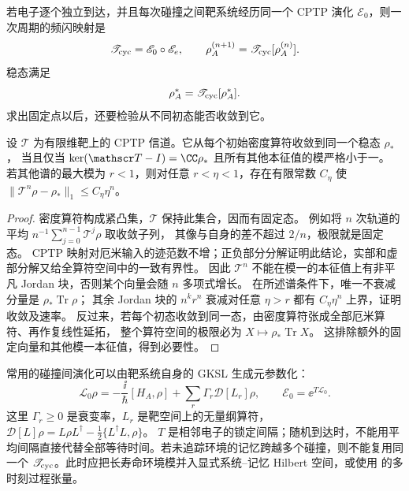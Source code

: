 若电子逐个独立到达，并且每次碰撞之间靶系统经历同一个 CPTP 演化 $\mathscr E_0$，则一次周期的频闪映射是
\begin{equation}
{
\mathscr T_{\rm cyc}=\mathscr E_0\circ\mathscr E_e,
\qquad
\rho_A^{(n+1)}=\mathscr T_{\rm cyc}[\rho_A^{(n)}].}
\label{eq:feberi_stroboscopic_map}
\end{equation}
稳态满足
\begin{equation}
{
\rho_A^*=\mathscr T_{\rm cyc}[\rho_A^*].}
\label{eq:general_collision_fixed_point}
\end{equation}
求出固定点以后，还要检验从不同初态能否收敛到它。
\begin{proposition}[有限维频闪信道的收敛条件]
设 $\mathscr T$ 为有限维靶上的 CPTP 信道。它从每个初始密度算符收敛到同一个稳态 $\rho_*$，
当且仅当 $\ker(\mathscr T-I)=\CC\rho_*$ 且所有其他本征值的模严格小于一。
若其他谱的最大模为 $r<1$，则对任意 $r<\eta<1$，存在有限常数 $C_\eta$ 使
$\|\mathscr T^n\rho-\rho_*\|_1\le C_\eta\eta^n$。
\end{proposition}
\begin{proof}
密度算符构成紧凸集，$\mathscr T$ 保持此集合，因而有固定态。
例如将 $n$ 次轨道的平均 $n^{-1}\sum_{j=0}^{n-1}\mathscr T^j\rho$ 取收敛子列，
其像与自身的差不超过 $2/n$，极限就是固定态。
CPTP 映射对厄米输入的迹范数不增；正负部分分解证明此结论，实部和虚部分解又给全算符空间中的一致有界性。
因此 $\mathscr T^n$ 不能在模一的本征值上有非平凡 Jordan 块，否则某个向量会随 $n$ 多项式增长。
在所述谱条件下，唯一不衰减分量是 $\rho_*\operatorname{Tr}\rho$；
其余 Jordan 块的 $n^k r^n$ 衰减对任意 $\eta>r$ 都有 $C_\eta\eta^n$ 上界，证明收敛及速率。
反过来，若每个初态收敛到同一态，由密度算符张成全部厄米算符、再作复线性延拓，
整个算符空间的极限必为 $X\mapsto\rho_*\operatorname{Tr}X$。
这排除额外的固定向量和其他模一本征值，得到必要性。
\end{proof}

常用的碰撞间演化可以由靶系统自身的 GKSL 生成元参数化：
\begin{equation}
{
\mathcal L_0\rho
=-\frac{\ii}{\hbar}[H_A,\rho]
+\sum_r\Gamma_r\mathcal D[L_r]\rho,
\qquad
\mathscr E_0=\ee^{T\mathcal L_0}.}
\label{eq:general_target_intercollision_lindblad}
\end{equation}
这里 $\Gamma_r\ge0$ 是衰变率，$L_r$ 是靶空间上的无量纲算符，
$\mathcal D[L]\rho=L\rho L^\dagger-\tfrac12\{L^\dagger L,\rho\}$。
$T$ 是相邻电子的锁定间隔；随机到达时，不能用平均间隔直接代替全部等待时间。若未追踪环境的记忆跨越多个碰撞，则不能复用同一个 $\mathscr T_{\rm cyc}$。此时应把长寿命环境模并入显式系统--记忆 Hilbert 空间，或使用 的多时刻过程张量。

